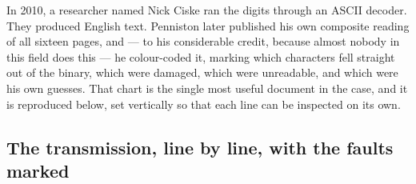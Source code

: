 In 2010, a researcher named Nick Ciske ran the digits through an ASCII decoder. They
produced English text. Penniston later published his own composite reading of all sixteen
pages, and --- to his considerable credit, because almost nobody in this field does this ---
he colour-coded it, marking which characters fell straight out of the binary, which were
damaged, which were unreadable, and which were his own guesses. That chart is the single
most useful document in the case, and it is reproduced below, set vertically so that each
line can be inspected on its own.

\subsection*{The transmission, line by line, with the faults marked}

\newcommand{\pnd}[1]{{\color{inkblue}#1}}%
\newcommand{\pnq}[1]{{\color{gapred}\bfseries #1}}%
\newcommand{\pnu}{{\color{gapred}\bfseries ???}}%
\newcommand{\pni}[1]{{\color{ufogreendark}\bfseries #1}}%
\newcommand{\pnp}{{\color{amber}\bfseries .}}%

